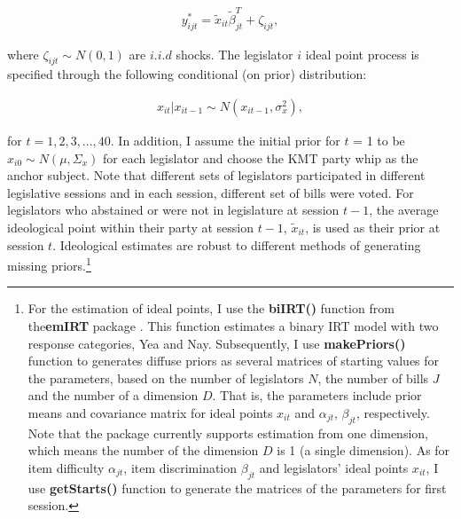 \begin{equation}
\begin{aligned}
{y_{ijt}^{*}=\tilde{x}_{it}\tilde{\beta}_{jt}^{T}+\zeta_{ijt},}
\end{aligned}
\end{equation}


\noindent where $\zeta_{ijt}\sim N(0,1)$ are $i.i.d$ shocks. The legislator $i$ ideal point process is specified through the following conditional (on prior) distribution:

\begin{equation}
\begin{aligned}
{x_{it}|x_{it-1}\sim N(x_{it-1},\sigma_{x}^{2}),}\label{eq:ideal-point}
\end{aligned}
\end{equation}

\noindent for $t=1,2,3,...,40$. In addition, I assume the initial prior for $t$ = 1 to be $x_{i0}\sim N(\mu,\Sigma_{x})$ for each legislator and choose the KMT party whip as the anchor subject. Note that different sets of legislators participated in different legislative sessions and in each session, different set of bills were voted. For legislators who abstained or were not in legislature at session $t-1$, the average ideological point within their party at session $t-1$, $\tilde{x}_{it}$, is used as their prior at session $t$. Ideological estimates are robust to different methods of generating missing priors.\footnote{For the estimation of ideal points, I use the \textbf{biIRT()} function from the\textbf{emIRT} package \citep[see][]{emIRT2021}. This function estimates a binary IRT model with two response categories, Yea and Nay. Subsequently, I use \textbf{makePriors()} function to generates diffuse priors as several matrices of starting values for the parameters, based on the number of legislators $N$, the number of bills $J$ and the number of a dimension $D$. That is, the parameters include prior means and covariance matrix for ideal points $x_{it}$ and $\alpha_{jt}$, $\beta_{jt}$, respectively. Note that the package currently supports estimation from one dimension, which means the number of the dimension $D$ is 1 (a single dimension). As for item difficulty $\alpha_{jt}$, item discrimination $\beta_{jt}$ and legislators' ideal points $x_{it}$, I use \textbf{getStarts()} function to generate the matrices of the parameters for first session.} 

